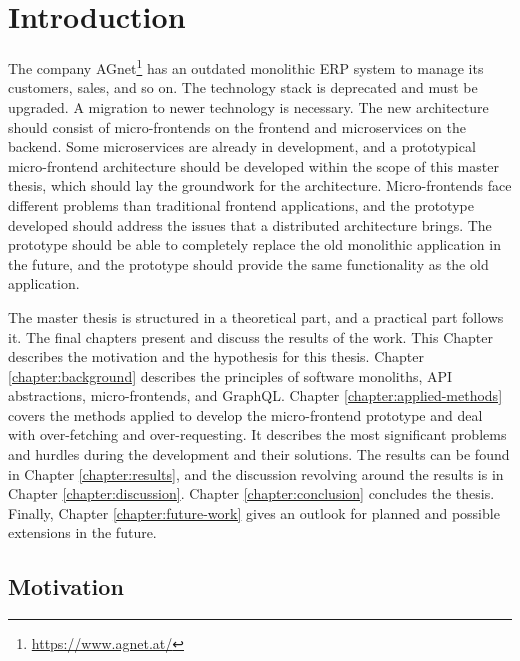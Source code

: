 \chapter{Introduction}\label{chapter:introduction}

The company AGnet\footnote{\url{https://www.agnet.at/}} has an outdated monolithic \ac{ERP} system to manage its customers, sales, and so on. The technology stack is deprecated and must be upgraded. A migration to newer technology is necessary. The new architecture should consist of micro-frontends on the frontend and microservices on the backend. Some microservices are already in development, and a prototypical micro-frontend architecture should be developed within the scope of this master thesis, which should lay the groundwork for the architecture. Micro-frontends face different problems than traditional frontend applications, and the prototype developed should address the issues that a distributed architecture brings. The prototype should be able to completely replace the old monolithic application in the future, and the prototype should provide the same functionality as the old application.

\bigskip

\noindent The master thesis is structured in a theoretical part, and a practical part follows it. The final chapters present and discuss the results of the work. This Chapter describes the motivation and the hypothesis for this thesis. Chapter \ref{chapter:background} describes the principles of software monoliths, \ac{API} abstractions, micro-frontends, and GraphQL. Chapter \ref{chapter:applied-methods} covers the methods applied to develop the micro-frontend prototype and deal with over-fetching and over-requesting. It describes the most significant problems and hurdles during the development and their solutions. The results can be found in Chapter \ref{chapter:results}, and the discussion revolving around the results is in Chapter \ref{chapter:discussion}. Chapter \ref{chapter:conclusion} concludes the thesis. Finally, Chapter \ref{chapter:future-work} gives an outlook for planned and possible extensions in the future.

\section{Motivation}\label{section:introduction:motivation}

